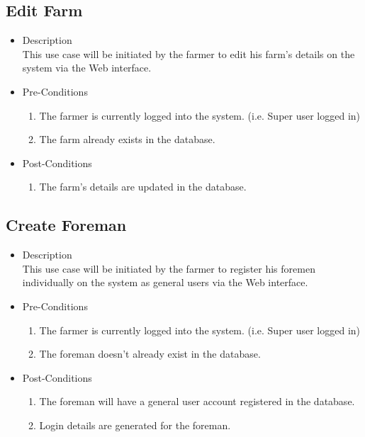 \documentclass[11pt,fleqn]{book} %
\begin{document}
	\subsection{Edit Farm}
	\begin{itemize}
		\item Description\\
		This use case will be initiated by the farmer to edit his farm’s details on the system via the Web interface.
		\item Pre-Conditions
		\begin{enumerate}
			\item The farmer is currently logged into the system. (i.e. Super user logged in)
			\item The farm already exists in the database.					
		\end{enumerate}
		\item Post-Conditions
		\begin{enumerate}
			\item The farm’s details are updated in the database.
		\end{enumerate}
	\end{itemize}
	
	\subsection{Create Foreman}
	\begin{itemize}
		\item Description\\
		This use case will be initiated by the farmer to register his foremen individually on the system as general users via the Web interface.
		\item Pre-Conditions
		\begin{enumerate}
			\item The farmer is currently logged into the system. (i.e. Super user logged in)
			\item The foreman doesn’t already exist in the database.
		\end{enumerate}
		\item Post-Conditions
		\begin{enumerate}
			\item The foreman will have a general user account registered in the database.
			\item Login details are generated for the foreman.				
		\end{enumerate}
	\end{itemize}
	
\end{document}
